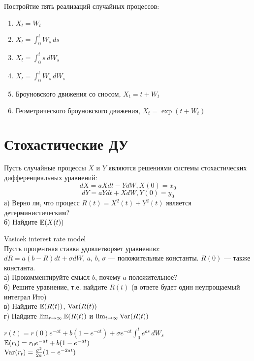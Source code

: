 \begin{problem}
Постройтие пять реализаций случайных процессов:
\begin{enumerate}
\item $X_t=W_t$
\item $X_t=\int_0^t W_s \, ds$
\item $X_t=\int_0^t s \, dW_s$
\item $X_t=\int_0^t W_s \, dW_s$
\item Броуновского движения со сносом, $X_t=t+W_t$
\item Геометрического броуновского движения, $X_t=\exp(t+W_t)$
\end{enumerate}
\end{problem}

\begin{solution}
\end{solution}



\section{Стохастические ДУ} 

\begin{problem}
Пусть случайные процессы $X$ и $Y$ являются решениями системы стохастических дифференциальных уравнений: 
$$dX=aXdt-YdW, X(0)=x_{0}$$
$$dY=aYdt+XdW, Y(0)=y_{0}$$
а) Верно ли, что процесс $R(t)=X^{2}(t)+Y^{2}(t)$ является детерминистическим? \\
б) Найдите $\mathbb{E}(X(t))$ \\

\end{problem} 
\begin{solution} 

\end{solution}

\begin{problem}
 Vasicek interest rate model \\
Пусть процентная ставка удовлетворяет уравнению: \\
$dR=a(b-R)dt+\sigma dW$, $a$, $b$, $\sigma$ --- положительные константы. $R(0)$ --- также константа. \\
а) Прокомментируйте смысл $b$, почему $a$ положительное? \\
б) Решите уравнение, т.е. найдите $R(t)$ (в ответе будет один неупрощаемый интеграл Ито) \\
в) Найдите $\mathbb{E}(R(t))$, $\operatorname{Var}(R(t))$ \\
г) Найдите $\lim_{t\rightarrow\infty}\mathbb{E}(R(t))$ и $\lim_{t\rightarrow\infty}\operatorname{Var}(R(t))$ 
\end{problem} 
\begin{solution} 


$ r(t) = r(0) e^{-a t} +  b \left(1- e^{-a t}\right) + \sigma e^{-a t}\int_0^t e^{a s}\,dW_s$ \\
$\mathbb{E}(r_t)=r_{0}e^{-at}+b(1-e^{-at})$ \\
$\operatorname{Var}(r_t) = \frac{\sigma^2}{2 a}(1 - e^{-2at})$ 
\end{solution}

